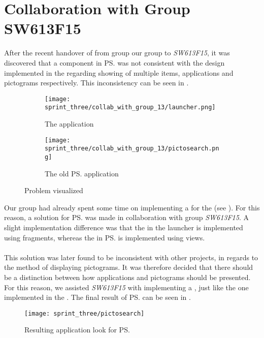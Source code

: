
\section{Collaboration with Group SW613F15}
\label{sec:collaboration_with_group_sw613f15}

After the recent handover of \gc from group our group to \emph{SW613F15}, it was discovered that a component in \ps was not consistent with the design implemented in the \launcher regarding showing of multiple items, applications and pictograms respectively. This inconsistency can be seen in .

\begin{figure}[!htbp]
    \centering

    \begin{subfigure}[t]{0.75\textwidth}
        \texttt{[image: sprint\_three/collab\_with\_group\_13/launcher.png]}
        \caption{The \launcher application}
        \label{fig:collab_with_group_13_launhcer}
        \vspace*{1cm}
    \end{subfigure}
    \hfill
    \begin{subfigure}[t]{0.75\textwidth}
        \texttt{[image: sprint\_three/collab\_with\_group\_13/pictosearch.png]}
        \caption{The old \ps application}
        \label{fig:collab_with_group_13_pictosearch}
    \end{subfigure}
    
    \caption{Problem visualized}
    \label{fig:collab_with_group_13}
\end{figure}

Our group had already spent some time on implementing a  for the \launcher (see ). For this reason, a solution for \ps was made in collaboration with group \emph{SW613F15}. A slight implementation difference was that the  in the launcher is implemented using fragments, whereas the  in \ps is implemented using views.  
\\\\ 
This solution was later found to be inconsistent with other projects, in regards to the method of displaying pictograms. It was therefore decided that there should be a distinction between how applications and pictograms should be presented. For this reason, we assisted \emph{SW613F15} with implementing a , just like the one implemented in the \ct. The final result of \ps can be seen in .

\begin{figure}[!htbp]
    \centering
    \texttt{[image: sprint\_three/pictosearch]}
    \caption{Resulting application look for \ps}
    \label{fig:pictosearch}
\end{figure}